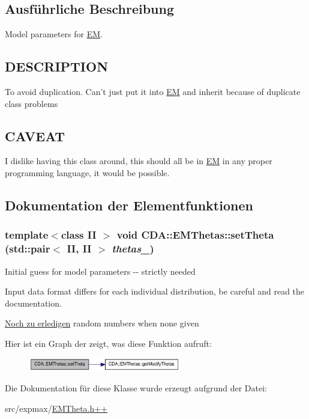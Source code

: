 \subsection{Ausführliche Beschreibung}
Model parameters for \hyperlink{classCDA_1_1EM}{EM}. \hypertarget{ProbabilisticClustering_8h_09_09_DESCRIPTION}{}\subsection{DESCRIPTION}\label{ProbabilisticClustering_8h_09_09_DESCRIPTION}
To avoid duplication. Can't just put it into \hyperlink{classCDA_1_1EM}{EM} and inherit because of duplicate class problems\hypertarget{classCDA_1_1EMThetas_ARCHITECTURE}{}\subsection{CAVEAT}\label{classCDA_1_1EMThetas_ARCHITECTURE}
I dislike having this class around, this should all be in \hyperlink{classCDA_1_1EM}{EM} in any proper programming language, it would be possible. 

\subsection{Dokumentation der Elementfunktionen}
\hypertarget{classCDA_1_1EMThetas_a1c8058269e4d8a32a2dd58f13ad94369}{
\subsubsection[{setTheta}]{\setlength{\rightskip}{0pt plus 5cm}template$<$class II $>$ void CDA::EMThetas::setTheta (std::pair$<$ II, II $>$ {\em thetas\_\-})}}
\label{classCDA_1_1EMThetas_a1c8058269e4d8a32a2dd58f13ad94369}
Initial guess for model parameters -\/-\/ strictly needed

Input data format differs for each individual distribution, be careful and read the documentation.

\begin{Desc}
\item[\hyperlink{todo__todo000002}{Noch zu erledigen}]random numbers when none given \end{Desc}


Hier ist ein Graph der zeigt, was diese Funktion aufruft:\nopagebreak
\begin{figure}[H]
\begin{center}
\leavevmode
\includegraphics[width=189pt]{classCDA_1_1EMThetas_a1c8058269e4d8a32a2dd58f13ad94369_cgraph}
\end{center}
\end{figure}




Die Dokumentation für diese Klasse wurde erzeugt aufgrund der Datei:\begin{DoxyCompactItemize}
\item 
src/expmax/\hyperlink{EMTheta_8h_09_09}{EMTheta.h++}\end{DoxyCompactItemize}
